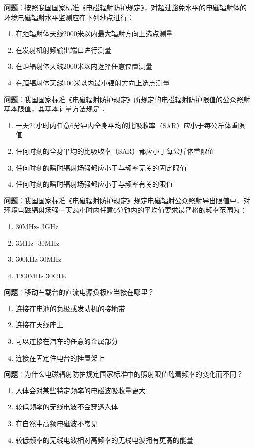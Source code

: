 \documentclass{ctexbook}
\begin{document}
\textbf{问题：}按照我国国家标准《电磁辐射防护规定》，对超过豁免水平的电磁辐射体的环境电磁辐射水平监测应在下列地点进行：
\begin{enumerate}[label=\Alph*), leftmargin=3em]
\item 在距辐射体天线2000米以内最大辐射方向上选点测量
\item 在发射机射频输出端口进行测量
\item 在距辐射体天线2000米以内选择任意位置测量
\item 在距辐射体天线100米以内最小辐射方向上选点测量
\end{enumerate}

\textbf{问题：}我国国家标准《电磁辐射防护规定》所规定的电磁辐射防护限值的公众照射基本限值，其基本计量方法规是：
\begin{enumerate}[label=\Alph*), leftmargin=3em]
\item 一天24小时内任意6分钟内全身平均的比吸收率（SAR）应小于每公斤体重限值
\item 任何时刻的全身平均的比吸收率（SAR）都应小于每公斤体重限值
\item 任何时刻的瞬时辐射场强都应小于与频率无关的固定限值
\item 任何时刻的瞬时辐射场强都应小于与频率有关的限值
\end{enumerate}

\textbf{问题：}我国国家标准《电磁辐射防护规定》规定电磁辐射公众照射导出限值中，对环境电磁辐射场强一天24小时内任意6分钟内的平均值要求最严格的频率范围为：
\begin{enumerate}[label=\Alph*), leftmargin=3em]
\item 30MHz- 3GHz
\item 3MHz- 30MHz
\item 300kHz-30MHz
\item 1200MHz-30GHz
\end{enumerate}

\textbf{问题：}移动车载台的直流电源负极应当接在哪里？
\begin{enumerate}[label=\Alph*), leftmargin=3em]
\item 连接在电池的负极或发动机的接地带
\item 连接在天线座上
\item 可以连接在汽车的任意的金属部分
\item 连接在固定住电台的挂置架上
\end{enumerate}

\textbf{问题：}为什么电磁辐射防护规定国家标准中的照射限值随着频率的变化而不同？
\begin{enumerate}[label=\Alph*), leftmargin=3em]
\item 人体会对某些特定频率的电磁波吸收量更大
\item 较低频率的无线电波不会穿透人体
\item 在自然中高频电磁波不常见
\item 较低频率的无线电波相对高频率的无线电波拥有更高的能量
\end{enumerate}
\end{document}
